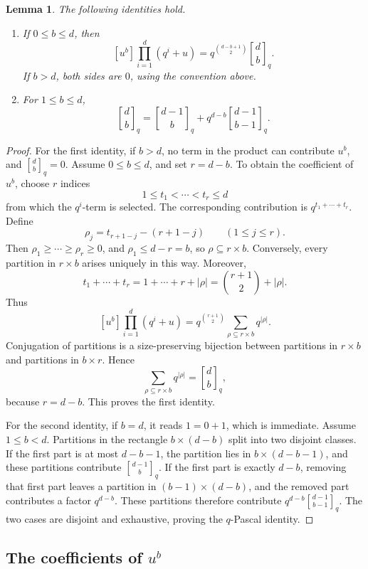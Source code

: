 \documentclass[12pt]{article}
\newtheorem{lemma}[theorem]{Lemma}
\newcommand{\qbinom}[2]{\genfrac{[}{]}{0pt}{}{#1}{#2}_q}
\begin{document}
\begin{lemma}\label{lem:gaussian}
The following identities hold.

\begin{enumerate}
\item If \(0\le b\le d\), then
\[
[u^b]\prod_{i=1}^{d}(q^i+u)
=
q^{\binom{d-b+1}{2}}\qbinom{d}{b}.
\]
If \(b>d\), both sides are \(0\), using the convention above.

\item For \(1\le b\le d\),
\[
\qbinom{d}{b}
=
\qbinom{d-1}{b}
+
q^{d-b}\qbinom{d-1}{b-1}.
\]
\end{enumerate}
\end{lemma}

\begin{proof}
For the first identity, if \(b>d\), no term in the product can contribute \(u^b\), and \(\qbinom{d}{b}=0\).  Assume \(0\le b\le d\), and set \(r=d-b\).  To obtain the coefficient of \(u^b\), choose \(r\) indices
\[
1\le t_1<\cdots<t_r\le d
\]
from which the \(q^i\)-term is selected.  The corresponding contribution is \(q^{t_1+\cdots+t_r}\).  Define
\[
\rho_j=t_{r+1-j}-(r+1-j)\qquad (1\le j\le r).
\]
Then \(\rho_1\ge \cdots\ge \rho_r\ge 0\), and \(\rho_1\le d-r=b\), so \(\rho\subseteq r\times b\).  Conversely, every partition in \(r\times b\) arises uniquely in this way.  Moreover,
\[
t_1+\cdots+t_r
=
1+\cdots+r+|\rho|
=
\binom{r+1}{2}+|\rho|.
\]
Thus
\[
[u^b]\prod_{i=1}^{d}(q^i+u)
=
q^{\binom{r+1}{2}}
\sum_{\rho\subseteq r\times b}q^{|\rho|}.
\]
Conjugation of partitions is a size-preserving bijection between partitions in \(r\times b\) and partitions in \(b\times r\).  Hence
\[
\sum_{\rho\subseteq r\times b}q^{|\rho|}
=
\qbinom{d}{b},
\]
because \(r=d-b\).  This proves the first identity.

For the second identity, if \(b=d\), it reads \(1=0+1\), which is immediate.  Assume \(1\le b<d\).  Partitions in the rectangle \(b\times(d-b)\) split into two disjoint classes.  If the first part is at most \(d-b-1\), the partition lies in \(b\times(d-b-1)\), and these partitions contribute \(\qbinom{d-1}{b}\).  If the first part is exactly \(d-b\), removing that first part leaves a partition in \((b-1)\times(d-b)\), and the removed part contributes a factor \(q^{d-b}\).  These partitions therefore contribute \(q^{d-b}\qbinom{d-1}{b-1}\).  The two cases are disjoint and exhaustive, proving the \(q\)-Pascal identity.
\end{proof}

\subsection{The coefficients of \(u^b\)}
\end{document}
